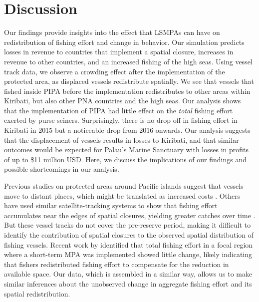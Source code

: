 \documentclass[9p,twocolumn,twoside,lineno]{pnas-new}
\begin{document}
\section{Discussion}

Our findings provide insights into the effect that LSMPAs can have on redistribution of fishing effort and change in behavior. Our simulation predicts losses in revenue to countries that implement a spatial closure, increases in revenue to other countries, and an increased fishing of the high seas. Using vessel track data, we observe a crowding effect after the implementation of the protected area, as displaced vessels redistribute spatially. We see that vessels that fished inside PIPA before the implementation redistributes to other areas within Kiribati, but also other PNA countries and the high seas. Our analysis shows that the implementation of PIPA had little effect on the \emph{total} fishing effort exerted by purse seiners. Surprisingly, there is no drop off in fishing effort in Kiribati in 2015 but a noticeable drop from 2016 onwards. Our analysis suggests that the displacement of vessels results in losses to Kiribati, and that similar outcomes would be expected for Palau's Marine Sanctuary with losses in profits of up to \$11 million USD. Here, we discuss the implications of our findings and possible shortcomings in our analysis.

Previous studies on protected areas around Pacific islands suggest that vessels move to distant places, which might be translated as increased costs \citep{stevenson_2013}. Others have used similar satellite-tracking systems to show that fishing effort accumulates near the edges of spatial closures, yielding greater catches over time \citep{murawski_2005}. But these vessel tracks do not cover the pre-reserve period, making it difficult to identify the contribution of spatial closures to the observed spatial distribution of fishing vessels. Recent work by \cite{elahi_2018} identified that total fishing effort in a focal region where a short-term MPA was implemented showed little change, likely indicating that fishers redistributed fishing effort to compensate for the reduction in available space. Our data, which is assembled in a similar way, allows us to make similar inferences about the unobserved change in aggregate fishing effort and its spatial redistribution.
\end{document}
